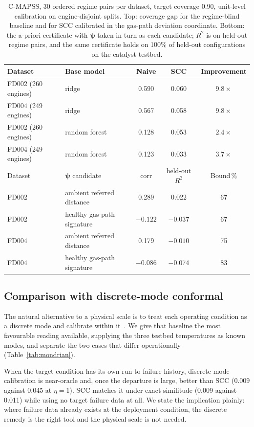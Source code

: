 \begin{table}[t]\centering\footnotesize
\setlength{\tabcolsep}{7pt}\renewcommand{\arraystretch}{1.2}
\caption{C-MAPSS, 30 ordered regime pairs per dataset, target coverage 0.90, unit-level calibration
on engine-disjoint splits. Top: coverage gap for the regime-blind baseline and for SCC calibrated in
the gas-path deviation coordinate. Bottom: the a-priori certificate with $\boldsymbol\psi$ taken in
turn as each candidate; $R^2$ is on held-out regime pairs, and the same certificate holds on 100\%
of held-out configurations on the catalyst testbed.}\label{tab:cmapss}
\begin{tabular}{@{}llccc@{}}\toprule
Dataset & Base model & Naive & SCC & Improvement \\\midrule
FD002 (260 engines) & ridge & 0.590 & 0.060 & $9.8\times$ \\
FD004 (249 engines) & ridge & 0.567 & 0.058 & $9.8\times$ \\
FD002 (260 engines) & random forest & 0.128 & 0.053 & $2.4\times$ \\
FD004 (249 engines) & random forest & 0.123 & 0.033 & $3.7\times$ \\\midrule
Dataset & $\boldsymbol\psi$ candidate & corr & held-out $R^2$ & Bound\,\% \\\midrule
FD002 & ambient referred distance & 0.289 & 0.022 & 67 \\
FD002 & healthy gas-path signature & $-0.122$ & $-0.037$ & 67 \\
FD004 & ambient referred distance & 0.179 & $-0.010$ & 75 \\
FD004 & healthy gas-path signature & $-0.086$ & $-0.074$ & 83 \\\bottomrule
\end{tabular}
\end{table}

\subsection{Comparison with discrete-mode conformal}\label{sec:res-mondrian}
The natural alternative to a physical scale is to treat each operating condition as a discrete mode
and calibrate within it~\cite{javanmardi2023conformal}. We give that baseline the most favourable
reading available, supplying the three testbed temperatures as known modes, and separate the two
cases that differ operationally (Table~\ref{tab:mondrian}).

When the target condition has its own run-to-failure history, discrete-mode calibration is
near-oracle and, once the departure is large, better than SCC (0.009 against 0.045 at $\eta=1$). SCC
matches it under exact similitude (0.009 against 0.011) while using no target failure data at all.
We state the implication plainly: where failure data already exists at the deployment condition, the
discrete remedy is the right tool and the physical scale is not needed.

